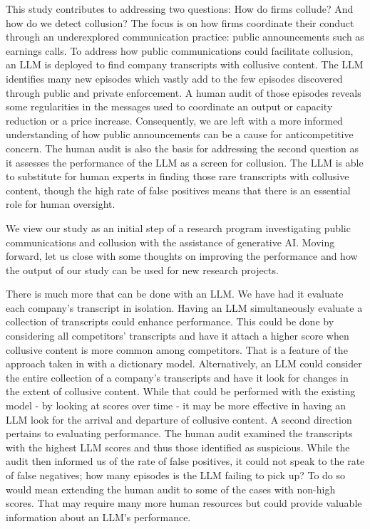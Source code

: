 This study contributes to addressing two questions: How do firms collude? 
And how do we detect collusion? The focus is on how firms coordinate their 
conduct through an underexplored communication practice: public announcements 
such as earnings calls. To address how public communications could 
facilitate collusion, an LLM is deployed to find company transcripts 
with collusive content. The LLM identifies many new episodes which vastly 
add to the few episodes discovered through public and private enforcement.
A human audit of those episodes reveals some regularities 
in the messages used to coordinate an output or capacity reduction or a 
price increase. Consequently, we are left with a more informed understanding 
of how public announcements can be a cause for anticompetitive concern. 
The human audit is also the basis for addressing the second question as 
it assesses the performance of the LLM as a screen for collusion. The 
LLM is able to substitute for human experts in finding those rare transcripts 
with collusive content, though the high rate of false positives means that there is 
an essential role for human oversight.

We view our study as an initial step of a research program investigating 
public communications and collusion with the assistance of generative AI. 
Moving forward, let us close with some thoughts on improving the performance 
and how the output of our study can be used for new research projects. 

There is much more that can be done with an LLM.  We have had it evaluate 
each company's transcript in isolation. Having an LLM simultaneously evaluate 
a collection of transcripts could enhance performance. This could be done 
by considering all competitors' transcripts and have it attach a higher score 
when collusive content is more common among competitors. That is a feature 
of the approach taken in \textcite{duso2025public} with a dictionary model. Alternatively, 
an LLM could consider the entire collection of a company's transcripts and have 
it look for changes in the extent of collusive content. While that could be 
performed with the existing model - by looking at scores over time - it may be 
more effective in having an LLM look for the arrival and departure of collusive 
content. A second direction pertains to evaluating performance. The human audit 
examined the transcripts with the highest LLM scores and thus those identified 
as suspicious. While the audit then informed us of the rate of false positives, 
it could not speak to the rate of false negatives; how many episodes is the 
LLM failing to pick up? To do so would mean extending the human audit to some 
of the cases with non-high scores. That may require many more human resources 
but could provide valuable information about an LLM's performance.

